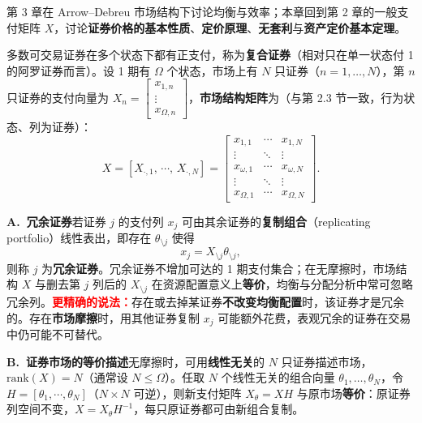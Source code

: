 

\ifdefined\WJHandoutKnowledge

第 3 章在 Arrow--Debreu 市场结构下讨论均衡与效率；本章回到第 2 章的一般支付矩阵 $X$，讨论\textbf{证券价格的基本性质}、\textbf{定价原理}、\textbf{无套利}与\textbf{资产定价基本定理}。

\begin{tcolorbox}[knowledge,title=4.1 一般市场结构]
多数可交易证券在多个状态下都有正支付，称为\textbf{复合证券}（相对只在单一状态付 1 的阿罗证券而言）。设 1 期有 $\Omega$ 个状态，市场上有 $N$ 只证券（$n=1,\dots,N$），第 $n$ 只证券的支付向量为 $X_n=\begin{bmatrix}x_{1,n} \\ \vdots \\ x_{\Omega,n}\end{bmatrix}$，\textbf{市场结构矩阵}为（与第 2.3 节一致，行为状态、列为证券）：
\[
    X=[X_{\cdot,1},\,\cdots,\,X_{\cdot,N}]=
    \begin{bmatrix}
        x_{1,1}   & \cdots & x_{1,N}   \\
        \vdots    & \ddots & \vdots    \\
        x_{\omega,1} & \cdots & x_{\omega,N} \\
        \vdots    & \ddots & \vdots    \\
        x_{\Omega,1} & \cdots & x_{\Omega,N}
    \end{bmatrix}.
\]

\tcbline

\textbf{A.\ 冗余证券}\quad 若证券 $j$ 的支付列 $x_j$ 可由其余证券的\textbf{复制组合}（replicating portfolio）线性表出，即存在 $\theta_{\setminus j}$ 使得
\[
    x_j=X_{\setminus j}\theta_{\setminus j},
\]
则称 $j$ 为\textbf{冗余证券}。冗余证券不增加可达的 1 期支付集合；在无摩擦时，市场结构 $X$ 与删去第 $j$ 列后的 $X_{\setminus j}$ 在资源配置意义上\textbf{等价}，均衡与分配分析中常可忽略冗余列。\textcolor{red}{\textbf{更精确的说法：}}存在或去掉某证券\textbf{不改变均衡配置}时，该证券才是冗余的。存在\textbf{市场摩擦}时，用其他证券复制 $x_j$ 可能额外花费，表观冗余的证券在交易中仍可能不可替代。

\tcbline

\textbf{B.\ 证券市场的等价描述}\quad 无摩擦时，可用\textbf{线性无关}的 $N$ 只证券描述市场，$\mathrm{rank}(X)=N$（通常设 $N\le\Omega$）。任取 $N$ 个线性无关的组合向量 $\theta_1,\dots,\theta_N$，令 $H=[\theta_1,\cdots,\theta_N]$（$N\times N$ 可逆），则新支付矩阵 $X_\theta=XH$ 与原市场\textbf{等价}：原证券列空间不变，$X=X_\theta H^{-1}$，每只原证券都可由新组合复制。


\end{tcolorbox}
